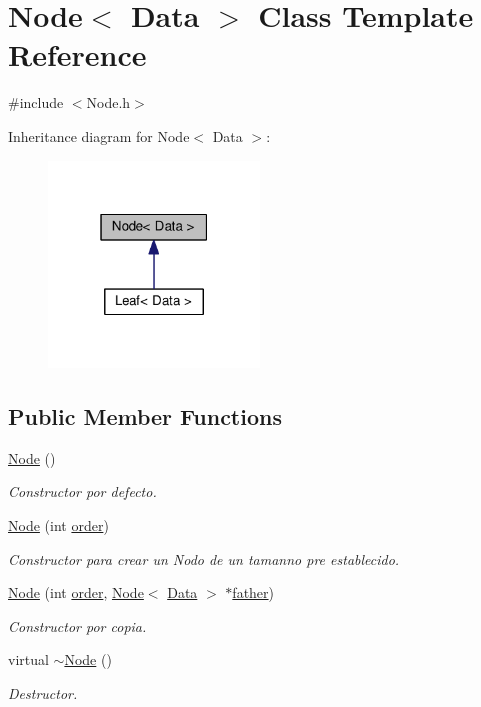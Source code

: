 \hypertarget{classNode}{}\section{Node$<$ Data $>$ Class Template Reference}
\label{classNode}


{\ttfamily \#include $<$Node.\+h$>$}



Inheritance diagram for Node$<$ Data $>$\+:\nopagebreak
\begin{figure}[H]
\begin{center}
\leavevmode
\includegraphics[width=159pt]{classNode__inherit__graph}
\end{center}
\end{figure}
\subsection*{Public Member Functions}
\begin{DoxyCompactItemize}
\item 
\hyperlink{classNode_a3e22ca89f75595b6020cfec6f05a8180}{Node} ()
\begin{DoxyCompactList}\small\item\em Constructor por defecto. \end{DoxyCompactList}\item 
\hyperlink{classNode_a69d52c1e2617398842a8fe1b009a16dd}{Node} (int \hyperlink{classNode_a672764de1b85ccfcb1c55429b5efbb1a}{order})
\begin{DoxyCompactList}\small\item\em Constructor para crear un Nodo de un tamanno pre establecido. \end{DoxyCompactList}\item 
\hyperlink{classNode_a0392b47c786821da7820c3a335cf9a21}{Node} (int \hyperlink{classNode_a672764de1b85ccfcb1c55429b5efbb1a}{order}, \hyperlink{classNode}{Node}$<$ \hyperlink{main_8cpp_a0c209e815d35b218025a240523b4335b}{Data} $>$ $\ast$\hyperlink{classNode_ab8b577c94add9ebf4392c82301bcc49e}{father})
\begin{DoxyCompactList}\small\item\em Constructor por copia. \end{DoxyCompactList}\item 
virtual \hyperlink{classNode_a726c47a8f963f9dc9e5d4b3ed3a63226}{$\sim$\+Node} ()
\begin{DoxyCompactList}\small\item\em Destructor. \end{DoxyCompactList}\end{DoxyCompactItemize}
